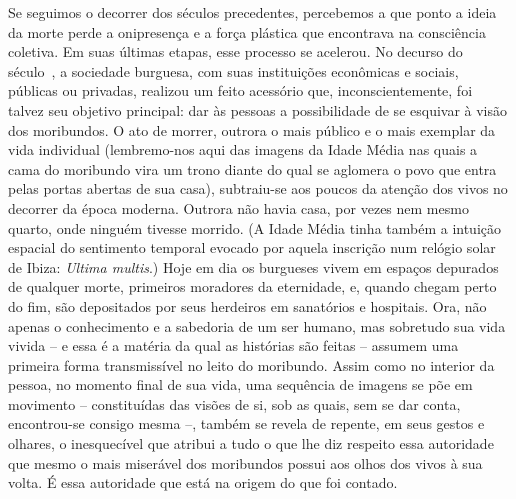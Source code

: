 Se seguimos o decorrer dos séculos precedentes, percebemos a que ponto a
ideia da morte perde a onipresença e a força plástica que encontrava na
consciência coletiva. Em suas últimas etapas, esse processo se acelerou.
No decurso do século~, a sociedade burguesa, com suas instituições
econômicas e sociais, públicas ou privadas, realizou um feito acessório
que, inconscientemente, foi talvez seu objetivo principal: dar às
pessoas a possibilidade de se esquivar à visão dos moribundos. O ato de
morrer, outrora o mais público e o mais exemplar da vida individual
(lembremo-nos aqui das imagens da Idade Média nas quais a cama do
moribundo vira um trono diante do qual se aglomera o povo que entra
pelas portas abertas de sua casa), subtraiu-se aos poucos da atenção dos
vivos no decorrer da época moderna. Outrora não havia casa, por vezes
nem mesmo quarto, onde ninguém tivesse morrido. (A Idade Média tinha
também a intuição espacial do sentimento temporal evocado por aquela
inscrição num relógio solar de Ibiza: \emph{Ultima multis}.) Hoje em dia
os burgueses vivem em espaços depurados de qualquer morte, primeiros
moradores da eternidade, e, quando chegam perto do fim, são depositados
por seus herdeiros em sanatórios e hospitais. Ora, não apenas o
conhecimento e a sabedoria de um ser humano, mas sobretudo sua vida
vivida -- e essa é a matéria da qual as histórias são feitas -- assumem
uma primeira forma transmissível no leito do moribundo. Assim como no
interior da pessoa, no momento final de sua vida, uma sequência de
imagens se põe em movimento -- constituídas das visões de si, sob as
quais, sem se dar conta, encontrou-se consigo mesma --, também se revela
de repente, em seus gestos e olhares, o inesquecível que atribui a tudo
o que lhe diz respeito essa autoridade que mesmo o mais miserável dos
moribundos possui aos olhos dos vivos à sua volta. É essa autoridade que
está na origem do que foi contado.

\section{}


